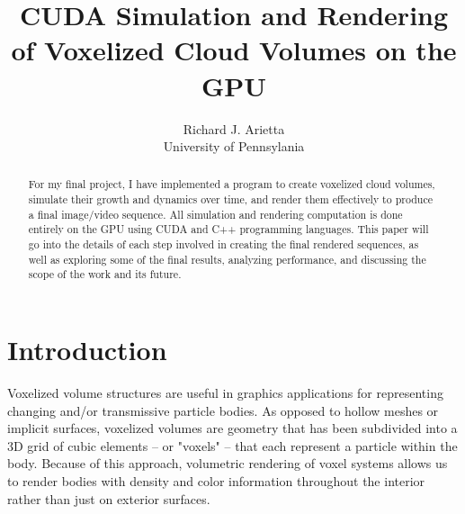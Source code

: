 \documentclass{jcgt}
\begin{document}
\title{CUDA Simulation and Rendering of Voxelized Cloud Volumes on the GPU}

\author
       {Richard J. Arietta\\University of Pennsylania}



\maketitle
\thispagestyle{firstpagestyle}

\begin{abstract}
\small
For my final project, I have implemented a program to create voxelized cloud 
volumes, simulate their growth and dynamics over time, and render them effectively 
to produce a final image/video sequence. All simulation and rendering computation 
is done entirely on the GPU using CUDA and C++ programming languages. This paper 
will go into the details of each step involved in creating the final rendered 
sequences, as well as exploring some of the final results, analyzing performance, 
and discussing the scope of the work and its future.

\end{abstract}


\section{Introduction}
\label{sec:introduction}
Voxelized volume structures are useful in graphics applications
for representing changing and/or transmissive particle bodies. As opposed to
hollow meshes or implicit surfaces, voxelized volumes are geometry that has 
been subdivided into a 3D grid of cubic elements -- or "voxels" -- that 
each represent a particle within the body. Because of this approach, 
volumetric rendering of voxel systems allows us to render bodies with density and 
color information throughout the interior rather than just on exterior surfaces.
\end{document}
